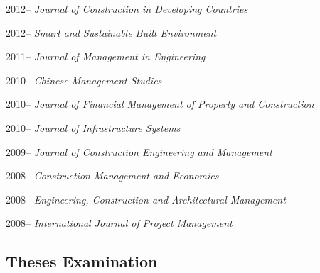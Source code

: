 \documentclass[11pt,a4paper]{report} %
\begin{document}
\begin{tablist}
        \item[2012--] \tab{}\textit{Journal of Construction in Developing Countries}
        
        \item[2012--] \tab{}\textit{Smart and Sustainable Built Environment}
        
        \item[2011--] \tab{}\textit{Journal of Management in Engineering}
        
        \item[2010--] \tab{}\textit{Chinese Management Studies}
        
        \item[2010--] \tab{}\textit{Journal of Financial Management of Property and Construction}
        
        \item[2010--] \tab{}\textit{Journal of Infrastructure Systems}
        
        \item[2009--] \tab{}\textit{Journal of Construction Engineering and Management}
        
        \item[2008--] \tab{}\textit{Construction Management and Economics}
        
        \item[2008--] \tab{}\textit{Engineering, Construction and Architectural Management}
        
        \item[2008--] \tab{}\textit{International Journal of Project Management}
    
    \end{tablist}

    \subsection*{Theses Examination}
\end{document}

